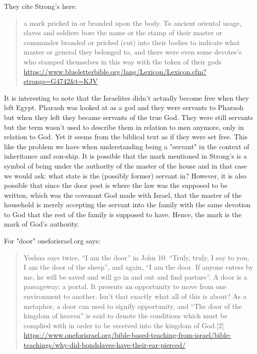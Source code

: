 \documentclass[11pt]{article}
\begin{document}
They cite Strong's here:
\begin{quote}
a mark pricked in or branded upon the body. To ancient oriental usage, slaves and soldiers bore the name or the stamp of their master or commander branded or pricked (cut) into their bodies to indicate what master or general they belonged to, and there were even some devotee's who stamped themselves in this way with the token of their gods \url{https://www.blueletterbible.org/lang/Lexicon/Lexicon.cfm?strongs=G4742&t=KJV}
\end{quote}

It is interesting to note that the Israelites didn't actually become free when they left Egypt. Pharaoh was looked at as a god and they were servants to Pharaoh but when they left they became servants of the true God. They were still servants but the term wasn't used to describe them in relation to men anymore, only in relation to God. Yet it seems from the biblical text as if they were set free. This like the problem we have when understanding being a "servant" in the context of inheritance and son-ship. It is possible that the mark mentioned in Strong's is a symbol of being under the authority of the master of the house and in that case we would ask: what state is the (possibly former) servant in? However, it is also possible that since the door post is where the law was the supposed to be written, which was the covenant God made with Israel, that the master of the household is merely accepting the servant into the family with the same devotion to God that the rest of the family is supposed to have. Hence, the mark is the mark of God's authority. \newline 

\noindent For "door" oneforisrael.org says:
\begin{quote}
Yeshua says twice, “I am the door” in John 10: “Truly, truly, I say to you, I am the door of the sheep”, and again, “I am the door. If anyone enters by me, he will be saved and will go in and out and find pasture”.
A door is a passageway; a portal. It presents an opportunity to move from one environment to another. Isn’t that exactly what all of this is about? As a metaphor, a door can used to signify opportunity, and “The door of the kingdom of heaven” is said to denote the conditions which must be complied with in order to be received into the kingdom of God.[2]
\url{https://www.oneforisrael.org/bible-based-teaching-from-israel/bible-teachings/why-did-bondslaves-have-their-ear-pierced/}
\end{quote}
\end{document}
